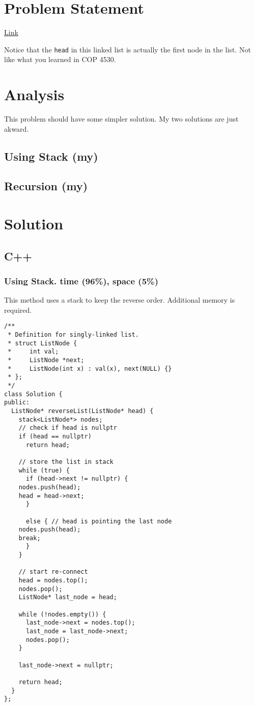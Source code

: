 \documentclass[12pt]{book}
\begin{document}
\section{Problem Statement}
\label{sec:orgfe5c0de}
\href{https://leetcode.com/problems/reverse-linked-list/}{Link}

Notice that the \texttt{head} in this linked list is actually the first node in the list. Not like what you learned in COP 4530.
\section{Analysis}
\label{sec:org95cb6c4}
This problem should have some simpler solution. My two solutions are just akward.
\subsection{Using Stack (my)}
\label{sec:orgc19fb8e}
\subsection{Recursion (my)}
\label{sec:org785bede}
\section{Solution}
\label{sec:org88596be}
\subsection{C++}
\label{sec:org6b9a0ef}
\subsubsection{Using Stack. time (96\%), space (5\%)}
\label{sec:org79f928f}
This method uses a stack to keep the reverse order. Additional memory is required.
\begin{verbatim}
/**
 * Definition for singly-linked list.
 * struct ListNode {
 *     int val;
 *     ListNode *next;
 *     ListNode(int x) : val(x), next(NULL) {}
 * };
 */
class Solution {
public:
  ListNode* reverseList(ListNode* head) {
    stack<ListNode*> nodes;
    // check if head is nullptr
    if (head == nullptr)
      return head;

    // store the list in stack 
    while (true) {
      if (head->next != nullptr) {
	nodes.push(head);
	head = head->next;
      }

      else { // head is pointing the last node
	nodes.push(head);
	break;
      }
    }

    // start re-connect
    head = nodes.top();
    nodes.pop();
    ListNode* last_node = head;

    while (!nodes.empty()) {
      last_node->next = nodes.top();
      last_node = last_node->next;
      nodes.pop();
    }

    last_node->next = nullptr;

    return head;
  }
};
\end{verbatim}
\end{document}
